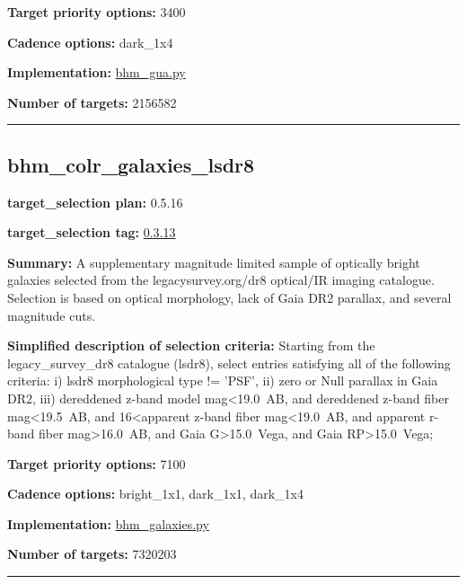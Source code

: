 \noindent\textbf{Target priority options:} 3400

\noindent\textbf{Cadence options:} dark\_1x4

\noindent\textbf{Implementation:}
\href{https://github.com/sdss/target_selection/blob/0.3.0/python/target_selection/cartons/bhm_gua.py}{bhm\_gua.py}

\noindent\textbf{Number of targets:} 2156582

\begin{center}\rule{0.5\linewidth}{0.5pt}\end{center}

\hypertarget{bhm_colr_galaxies_lsdr8_plan0.5.16}{%
\subsection{bhm\_colr\_galaxies\_lsdr8}\label{bhm_colr_galaxies_lsdr8_plan0.5.16}}

\noindent\textbf{target\_selection plan:} 0.5.16

\noindent\textbf{target\_selection tag:}
\href{https://github.com/sdss/target_selection/tree/0.3.13/}{0.3.13}

\noindent\textbf{Summary:} A supplementary magnitude limited sample of optically
bright galaxies selected from the legacysurvey.org/dr8 optical/IR
imaging catalogue. Selection is based on optical morphology, lack of
Gaia DR2 parallax, and several magnitude cuts.

\noindent\textbf{Simplified description of selection criteria:} Starting from the
legacy\_survey\_dr8 catalogue (lsdr8), select entries satisfying all of
the following criteria: i) lsdr8 morphological type != 'PSF', ii) zero
or Null parallax in Gaia DR2, iii) dereddened z-band model
mag\textless{}19.0~AB, and dereddened z-band fiber
mag\textless{}19.5~AB, and 16\textless{}apparent z-band fiber
mag\textless{}19.0~AB, and apparent r-band fiber
mag\textgreater{}16.0~AB, and Gaia G\textgreater{}15.0~Vega, and Gaia
RP\textgreater{}15.0~Vega;


\noindent\textbf{Target priority options:} 7100

\noindent\textbf{Cadence options:} bright\_1x1, dark\_1x1, dark\_1x4

\noindent\textbf{Implementation:}
\href{https://github.com/sdss/target_selection/blob/0.3.13/python/target_selection/cartons/bhm_galaxies.py}{bhm\_galaxies.py}

\noindent\textbf{Number of targets:} 7320203

\begin{center}\rule{0.5\linewidth}{0.5pt}\end{center}

